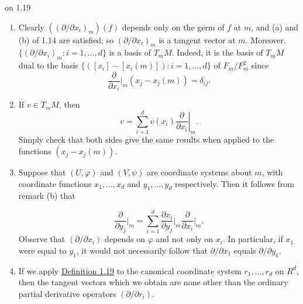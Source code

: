 \begin{remarks}{on 1.19}\label{thm:1.20}
	\begin{enumerate}
		\item[(a)] Clearly  $  ((\partial/\partial x_i)_m)(f)  $ depends only on the germ of  $  f  $ at  $  m  $, and (a) and (b) of 1.14 are satisfied; so  $  (\partial/\partial x_i)_m  $ is a tangent vector at  $  m  $. Moreover,  $  \{(\partial/\partial x_i)_m : i = 1, \ldots, d\}  $ is a basis of  $  T_{m} M  $. Indeed, it is the basis of  $  T_{m} M  $ dual to the basis  $  \{([x_i] - [x_i(m)]) : i = 1, \ldots, d\}  $ of  $  F_m/F_m^2  $ since
		      \[
			      \frac{\partial}{\partial x_{i}}\bigg|_{m}(x_{j}-x_{j}(m))=\delta_{ij}.
		      \]

		\item[(b)] If  $ v \in T_{m} M $, then
		      \[
			      v=\sum_{i=1}^{d}v(x_{i})\left.\frac{\partial}{\partial x_{i}}\right|_{m}.
		      \]
		      Simply check that both sides give the same results when applied to the functions $(x_{j}-x_{j}(m))$.

		\item[(c)] Suppose that $(U,\varphi)$ and $(V,\psi)$ are coordinate systems about $m$, with coordinate functions $x_{1},\ldots,x_{d}$ and $y_{1},\ldots,y_{d}$ respectively. Then it follows from remark (b) that

		      \[
			      \frac{\partial}{\partial y_{j}}\Big|_{m}=\sum_{i=1}^{d}\frac{\partial x_{i}}{\partial y_{j}}\Big|_{m}\frac{\partial}{\partial x_{i}}\Big|_{m}.
		      \]
		      Observe that $(\partial/\partial x_{i})$ depends on $\varphi$ and not only on $x_{i}$. In particular, if $x_{1}$ were equal to $y_{1}$, it would not necessarily follow that $\partial/\partial x_{1}$ equals $\partial/\partial y_{1}$.

		\item[(d)] If we apply \hyperref[thm:1.19]{Definition 1.19} to the canonical coordinate system  $ r_{1}, \ldots, r_{d} $ on  $ R^{d} $, then the tangent vectors which we obtain are none other than the ordinary partial derivative operators  $ (\partial/\partial r_{i}) $.
	\end{enumerate}
\end{remarks}

